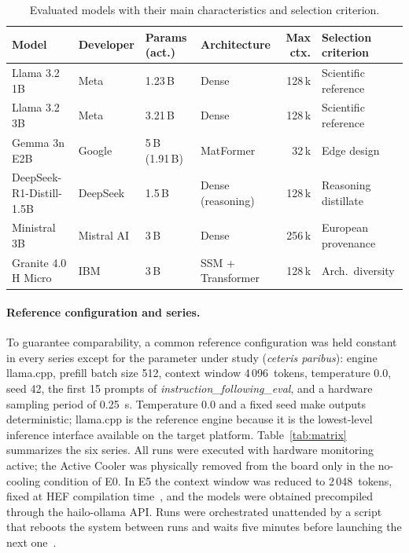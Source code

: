 \documentclass[acmsmall,natbib=false]{acmart}
\begin{document}
\begin{table}[t]
\centering
\caption{Evaluated models with their main characteristics and selection
criterion.}
\label{tab:models}
\footnotesize
\setlength{\tabcolsep}{3.5pt}
\begin{tabular}{l l l l r l}
\toprule
\textbf{Model} & \textbf{Developer} & \textbf{Params (act.)} &
\textbf{Architecture} & \textbf{Max ctx.} & \textbf{Selection criterion} \\
\midrule
Llama 3.2 1B & Meta & 1.23\,B & Dense & 128\,k & Scientific reference \\
Llama 3.2 3B & Meta & 3.21\,B & Dense & 128\,k & Scientific reference \\
Gemma 3n E2B & Google & 5\,B (1.91\,B) & MatFormer & 32\,k & Edge design \\
DeepSeek-R1-Distill-1.5B & DeepSeek & 1.5\,B & Dense (reasoning) & 128\,k & Reasoning distillate \\
Ministral 3B & Mistral AI & 3\,B & Dense & 256\,k & European provenance \\
Granite 4.0 H Micro & IBM & 3\,B & SSM + Transformer & 128\,k & Arch.\ diversity \\
\bottomrule
\end{tabular}
\end{table}

\paragraph{Reference configuration and series.}
To guarantee comparability, a common reference configuration was held constant
in every series except for the parameter under study (\emph{ceteris
paribus}): engine llama.cpp, prefill batch size 512, context window
4\,096~tokens, temperature 0.0, seed 42, the first 15 prompts of
\textit{instruction\_following\_eval}, and a hardware sampling period of
0.25~s. Temperature 0.0 and a fixed seed make outputs deterministic;
llama.cpp is the reference engine because it is the lowest-level inference
interface available on the target platform. Table~\ref{tab:matrix} summarizes the
six series. All runs were executed with hardware monitoring active; the Active
Cooler was physically removed from the board only in the no-cooling
condition of E0. In E5 the
context window was reduced to 2\,048~tokens, fixed at HEF compilation
time~\cite{HailoDeepSeekR1Qwen15B}, and the models were obtained precompiled
through the hailo-ollama API. Runs were orchestrated unattended by a script
that reboots the system between runs and waits five minutes before launching
the next one~\cite{carrascosa_carro_tfg-yisusccscripts_2026}.
\end{document}
